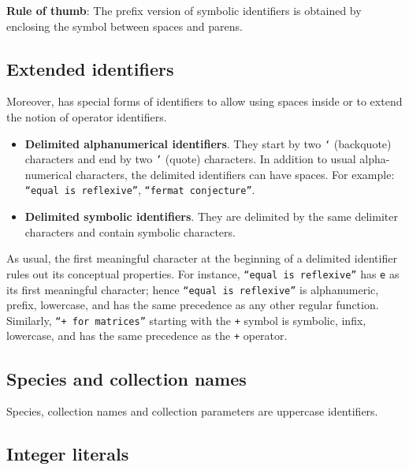 {\bf Rule of thumb}: The prefix version of symbolic identifiers is obtained
by enclosing the symbol between spaces and parens.

\subsection{Extended identifiers}
\label{extended-identifiers}

Moreover, {\focal} has special forms of identifiers to allow using
spaces inside or to extend the notion of operator identifiers.
\begin{itemize}
  \item {\bf Delimited alphanumerical identifiers}.
    They start by two {\tt `} (backquote) characters and end by two
    {\tt '} (quote) characters. In addition to usual alpha-numerical
    characters, the delimited identifiers can have spaces. For example:
    {\tt ``equal is reflexive''}, {\tt ``fermat conjecture''}.
  \item {\bf Delimited symbolic identifiers}.
    They are delimited by the same delimiter characters and contain
    symbolic characters.
\end{itemize}

As usual, the first meaningful character at the beginning of a delimited
identifier rules out its conceptual properties. For instance,
{\tt ``equal is reflexive''} has {\tt e} as its first meaningful character; hence
{\tt ``equal is reflexive''} is alphanumeric, prefix, lowercase, and has the
same precedence as any other regular function.
Similarly, {\tt ``+ for matrices''} starting with the {\tt +} symbol is
symbolic, infix, lowercase, and has the same precedence as the {\tt +} operator.

\subsection{Species and collection names}
 Species, collection
names and collection parameters are uppercase identifiers.

\subsection{Integer literals}
\label{integer literals}
\label{octal}
\label{hexadecimal}
\label{binary}


